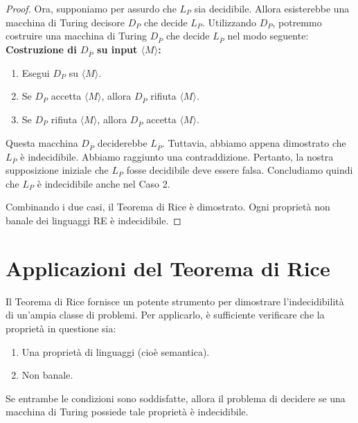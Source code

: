 \documentclass[a4paper]{article}
\theoremstyle{definition} %
\begin{document}
\begin{proof}
Ora, supponiamo per assurdo che $L_P$ sia decidibile. Allora esisterebbe una macchina di Turing decisore $D_P$ che decide $L_P$.
Utilizzando $D_P$, potremmo costruire una macchina di Turing $D_{\overline{P}}$ che decide $L_{\overline{P}}$ nel modo seguente:
\textbf{Costruzione di $D_{\overline{P}}$ su input $\langle M \rangle$:}
\begin{enumerate}
    \item Esegui $D_P$ su $\langle M \rangle$.
    \item Se $D_P$ accetta $\langle M \rangle$, allora $D_{\overline{P}}$ rifiuta $\langle M \rangle$.
    \item Se $D_P$ rifiuta $\langle M \rangle$, allora $D_{\overline{P}}$ accetta $\langle M \rangle$.
\end{enumerate}
Questa macchina $D_{\overline{P}}$ deciderebbe $L_{\overline{P}}$. Tuttavia, abbiamo appena dimostrato che $L_{\overline{P}}$ è indecidibile. Abbiamo raggiunto una contraddizione.
Pertanto, la nostra supposizione iniziale che $L_P$ fosse decidibile deve essere falsa. Concludiamo quindi che $L_P$ è indecidibile anche nel Caso 2.

Combinando i due casi, il Teorema di Rice è dimostrato. Ogni proprietà non banale dei linguaggi RE è indecidibile.
\end{proof}

\section{Applicazioni del Teorema di Rice}
Il Teorema di Rice fornisce un potente strumento per dimostrare l'indecidibilità di un'ampia classe di problemi. Per applicarlo, è sufficiente verificare che la proprietà in questione sia:
\begin{enumerate}
    \item Una proprietà di linguaggi (cioè semantica).
    \item Non banale.
\end{enumerate}
Se entrambe le condizioni sono soddisfatte, allora il problema di decidere se una macchina di Turing possiede tale proprietà è indecidibile.
\end{document}
